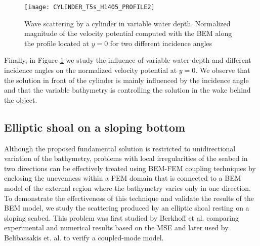 \begin{figure}
\begin{center}
\texttt{[image: CYLINDER\_T5s\_H1405\_PROFILE2]}
\caption{Wave scattering by a cylinder in variable water depth. Normalized magnitude of the velocity potential computed with the BEM along the profile located at $y=0$ for two different incidence angles}
\label{fig-Cylinder Variable Bathymetry PROFILE}
\end{center}
\end{figure}

Finally, in Figure \ref{fig-Cylinder Variable Bathymetry PROFILE} we study the influence of variable water-depth and different incidence angles on the normalized velocity potential at $y=0$. We observe that the solution in front of the cylinder is mainly influenced by the incidence angle and that the variable bathymetry is controlling the solution in the wake behind the object. 

\subsection{Elliptic shoal on a sloping bottom}
\label{SUBSECTION: ELLIPTICAL SHOAL}
Although the proposed fundamental solution is restricted to unidirectional variation of the bathymetry, problems with local irregularities of the seabed in two directions can be effectively treated using BEM-FEM coupling techniques \cite{Luis2015} by enclosing the unevenness within a FEM domain that is connected to a BEM model of the external region where the bathymetry varies only in one direction. To demonstrate the effectiveness of this technique and validate the results of the BEM model, we study the scattering produced by an elliptic shoal resting on a sloping seabed. This problem was first studied by Berkhoff et al. \cite{Berkhoff1982} comparing experimental and numerical results based on the MSE and later used by Belibassakis et. al. \cite{Belibassakis2001} to verify a coupled-mode model.

